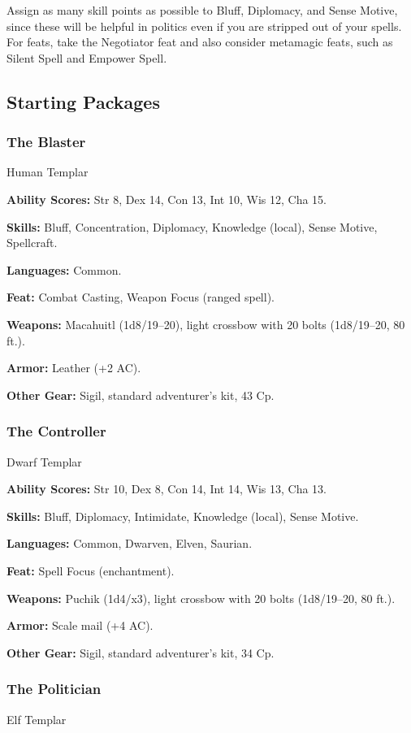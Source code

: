 Assign as many skill points as possible to Bluff, Diplomacy, and Sense Motive, since these will be helpful in politics even if you are stripped out of your spells. For feats, take the Negotiator feat and also consider metamagic feats, such as Silent Spell and Empower Spell.

\subsection{Starting Packages}
\subsubsection{The Blaster}
Human Templar

\textbf{Ability Scores:} Str 8, Dex 14, Con 13, Int 10, Wis 12, Cha 15.

\textbf{Skills:} Bluff, Concentration, Diplomacy, Knowledge (local), Sense Motive, Spellcraft.

\textbf{Languages:} Common.

\textbf{Feat:} Combat Casting, Weapon Focus (ranged spell).

\textbf{Weapons:} Macahuitl (1d8/19–20), light crossbow with 20 bolts (1d8/19–20, 80 ft.).

\textbf{Armor:} Leather (+2 AC).

\textbf{Other Gear:} Sigil, standard adventurer's kit, 43 Cp.

\subsubsection{The Controller}
Dwarf Templar

\textbf{Ability Scores:} Str 10, Dex 8, Con 14, Int 14, Wis 13, Cha 13.

\textbf{Skills:} Bluff, Diplomacy, Intimidate, Knowledge (local), Sense Motive.

\textbf{Languages:} Common, Dwarven, Elven, Saurian.

\textbf{Feat:} Spell Focus (enchantment).

\textbf{Weapons:} Puchik (1d4/x3), light crossbow with 20 bolts (1d8/19–20, 80 ft.).

\textbf{Armor:} Scale mail (+4 AC).

\textbf{Other Gear:} Sigil, standard adventurer's kit, 34 Cp.

\subsubsection{The Politician}
Elf Templar

